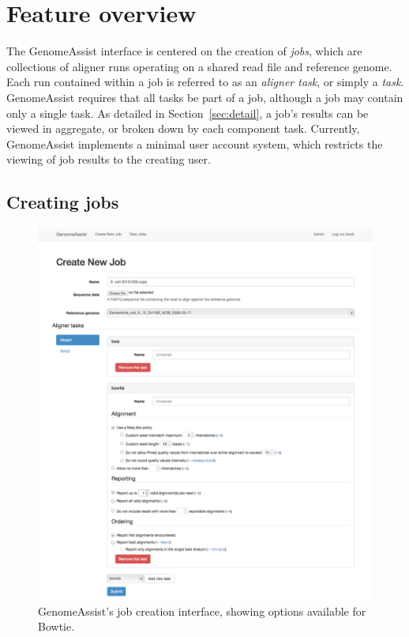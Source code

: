 \documentclass[11pt,twocolumn]{article}
\begin{document}
\section{Feature overview}

The GenomeAssist interface is centered on the creation of \textit{jobs},
which are collections of aligner runs operating on a shared read file
and reference genome.
Each run contained within a job is referred to as an \textit{aligner
task}, or simply a \textit{task}.
GenomeAssist requires that all tasks be part of a job, although a job
may contain only a single task.
As detailed in Section~\ref{sec:detail}, a job's results can be viewed
in aggregate, or broken down by each component task.
Currently, GenomeAssist implements a minimal user account system, which
restricts the viewing of job results to the creating user.


\subsection{Creating jobs}

\begin{figure}
\includegraphics[width=\textwidth]{screenshots/create-prefill-full}

\caption{
    \label{fig:create}
    GenomeAssist's job creation interface, showing options available
    for Bowtie.
}
\end{figure}
\end{document}
